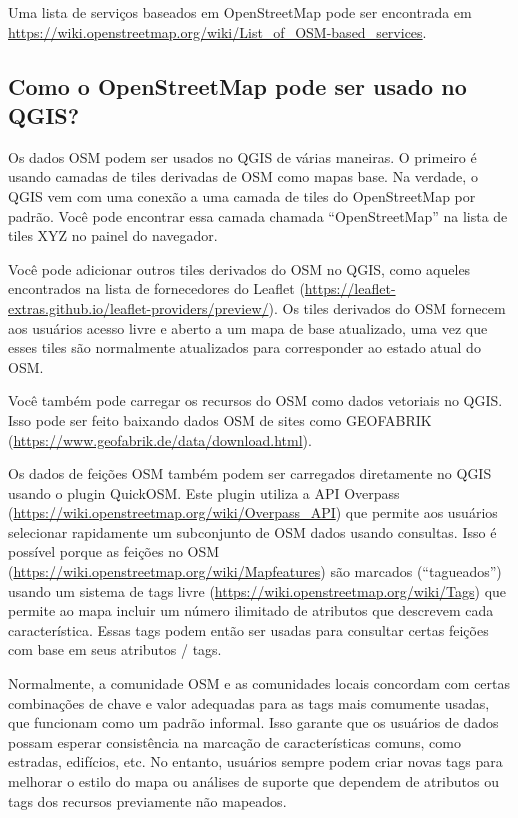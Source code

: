 \documentclass[
  portuguese,
]{krantz}
\begin{document}
Uma lista de serviços baseados em OpenStreetMap pode ser encontrada em \url{https://wiki.openstreetmap.org/wiki/List_of_OSM-based_services}.

\hypertarget{como-o-openstreetmap-pode-ser-usado-no-qgis}{%
\subsection{\texorpdfstring{\textbf{Como o OpenStreetMap pode ser usado no QGIS?}}{Como o OpenStreetMap pode ser usado no QGIS?}}\label{como-o-openstreetmap-pode-ser-usado-no-qgis}}

Os dados OSM podem ser usados no QGIS de várias maneiras. O primeiro é usando camadas de tiles derivadas de OSM como mapas base. Na verdade, o QGIS vem com uma conexão a uma camada de tiles do OpenStreetMap por padrão. Você pode encontrar essa camada chamada ``OpenStreetMap'' na lista de tiles XYZ no painel do navegador.

Você pode adicionar outros tiles derivados do OSM no QGIS, como aqueles encontrados na lista de fornecedores do Leaflet (\href{https://leaflet-extras.github\%20.io\%20/\%20leaflet-owners\%20/\%20preview\%20/}{https://leaflet-extras.github.io/leaflet-providers/preview/}). Os tiles derivados do OSM fornecem aos usuários acesso livre e aberto a um mapa de base atualizado, uma vez que esses tiles são normalmente atualizados para corresponder ao estado atual do OSM.

Você também pode carregar os recursos do OSM como dados vetoriais no QGIS. Isso pode ser feito baixando dados OSM de sites como GEOFABRIK (\url{https://www.geofabrik.de/data/download.html}).

Os dados de feições OSM também podem ser carregados diretamente no QGIS usando o plugin QuickOSM. Este plugin utiliza a API Overpass (\url{https://wiki.openstreetmap.org/wiki/Overpass_API}) que permite aos usuários selecionar rapidamente um subconjunto de OSM dados usando consultas. Isso é possível porque as feições no OSM (\url{https://wiki.openstreetmap.org/wiki/Mapfeatures}) são marcados (``tagueados'') usando um sistema de tags livre (\url{https://wiki.openstreetmap.org/wiki/Tags}) que permite ao mapa incluir um número ilimitado de atributos que descrevem cada característica. Essas tags podem então ser usadas para consultar certas feições com base em seus atributos / tags.

Normalmente, a comunidade OSM e as comunidades locais concordam com certas combinações de chave e valor adequadas para as tags mais comumente usadas, que funcionam como um padrão informal. Isso garante que os usuários de dados possam esperar consistência na marcação de características comuns, como estradas, edifícios, etc. No entanto, usuários sempre podem criar novas tags para melhorar o estilo do mapa ou análises de suporte que dependem de atributos ou tags dos recursos previamente não mapeados.
\end{document}
